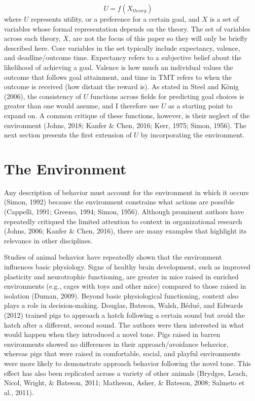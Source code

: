 \documentclass[english,,man]{apa6}
\theoremstyle{definition}
\theoremstyle{definition}
\theoremstyle{definition}
\theoremstyle{remark}
\begin{document}
\begin{equation}
U = f(X_{theory})
\end{equation} \noindent where \(U\) represents utility, or a preference
for a certain goal, and \(X\) is a set of variables whose formal
representation depends on the theory. The set of variables across each
theory, \(X\), are not the focus of this paper so they will only be
briefly described here. Core variables in the set typically include
expectancy, valence, and deadline/outcome time. Expectancy refers to a
subjective belief about the likelihood of achieving a goal. Valence is
how much an individual values the outcome that follows goal attainment,
and time in TMT refers to when the outcome is received (how distant the
reward is). As stated in Steel and König (2006), the consistency of
\(U\) functions across fields for predicting goal choices is greater
than one would assume, and I therefore use \(U\) as a starting point to
expand on. A common critique of these functions, however, is their
neglect of the environment (Johns, 2018; Kanfer \& Chen, 2016; Kerr,
1975; Simon, 1956). The next section presents the first extension of
\(U\) by incorporating the environment.

\hypertarget{the-environment}{%
\section{The Environment}\label{the-environment}}

Any description of behavior must account for the environment in which it
occurs (Simon, 1992) because the environment constrains what actions are
possible (Cappelli, 1991; Greeno, 1994; Simon, 1956). Although prominent
authors have repeatedly critiqued the limited attention to context in
organizational research (Johns, 2006; Kanfer \& Chen, 2016), there are
many examples that highlight its relevance in other disciplines.

Studies of animal behavior have repeatedly shown that the environment
influences basic physiology. Signs of healthy brain development, such as
improved plasticity and neurotrophic functioning, are greater in mice
raised in enriched environments (e.g., cages with toys and other mice)
compared to those raised in isolation (Duman, 2009). Beyond basic
physiological functioning, context also plays a role in decision-making.
Douglas, Bateson, Walsh, Bédué, and Edwards (2012) trained pigs to
approach a hatch following a certain sound but avoid the hatch after a
different, second sound. The authors were then interested in what would
happen when they introduced a novel tone. Pigs raised in barren
environments showed no differences in their approach/avoidance behavior,
whereas pigs that were raised in comfortable, social, and playful
environments were more likely to demonstrate approach behavior following
the novel tone. This effect has also been replicated across a variety of
other animals (Brydges, Leach, Nicol, Wright, \& Bateson, 2011;
Matheson, Asher, \& Bateson, 2008; Salmeto et al., 2011).
\end{document}
